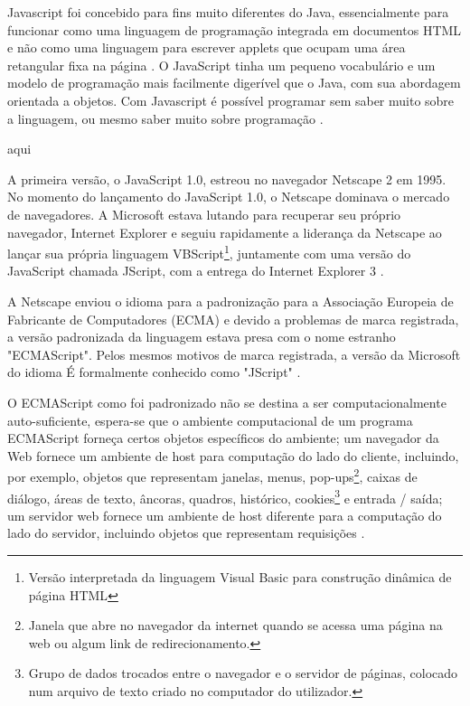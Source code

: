 Javascript foi concebido para fins muito diferentes do Java, essencialmente para funcionar como uma linguagem de programação integrada em documentos HTML e não como uma linguagem para escrever applets que ocupam uma área retangular fixa na página \citep{goodman2007javascript}. O JavaScript tinha um pequeno vocabulário e um modelo de programação mais facilmente digerível que o Java, com sua abordagem orientada a objetos. Com Javascript é possível programar sem saber muito sobre a linguagem, ou mesmo saber muito sobre programação \citep{crockford2008javascript}.

aqui \cite{ecmascript2016}

A primeira versão, o JavaScript 1.0, estreou no navegador Netscape 2 em 1995. No momento do lançamento do JavaScript 1.0, o Netscape dominava o mercado de navegadores. A Microsoft estava lutando para recuperar seu próprio navegador, Internet Explorer e seguiu rapidamente a liderança da Netscape ao lançar sua própria linguagem VBScript\footnote{Versão interpretada da linguagem Visual Basic para construção dinâmica de página HTML}, juntamente com uma versão do JavaScript chamada JScript, com a entrega do Internet Explorer 3 \citep{keith2010dom}.

A Netscape enviou o idioma para a padronização para a Associação Europeia de Fabricante de Computadores (ECMA) e devido a problemas de marca registrada, a versão padronizada da linguagem estava presa com o nome estranho "ECMAScript". Pelos mesmos motivos de marca registrada, a versão da Microsoft do idioma É formalmente conhecido como "JScript" \citep{flanagan2011javascript}. 

O ECMAScript como foi padronizado não se destina a ser computacionalmente auto-suficiente, espera-se que o ambiente computacional de um programa ECMAScript forneça certos objetos específicos do ambiente; um navegador da Web fornece um ambiente de host para computação do lado do cliente, incluindo, por exemplo, objetos que representam janelas, menus, pop-ups\footnote{Janela que abre no navegador da internet quando se acessa uma página na web ou algum link de redirecionamento.}, caixas de diálogo, áreas de texto, âncoras, quadros, histórico, cookies\footnote{Grupo de dados trocados entre o navegador e o servidor de páginas, colocado num arquivo de texto criado no computador do utilizador.} e entrada / saída; um servidor web fornece um ambiente de host diferente para a computação do lado do servidor, incluindo objetos que representam requisições \citep{ecmascript2016}.

